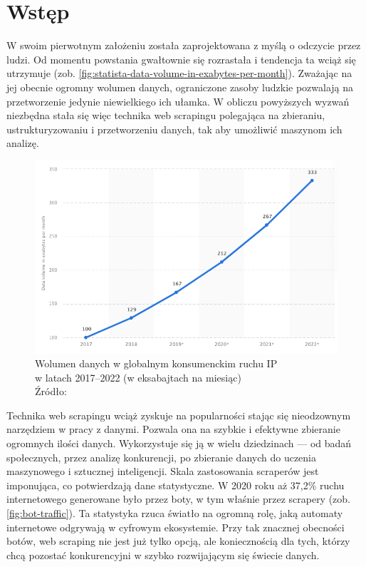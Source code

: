 \newpage


\section{Wstęp}\label{sec:wstep}

W swoim pierwotnym założeniu została zaprojektowana z myślą o odczycie przez ludzi.
Od momentu powstania gwałtownie się rozrastała i tendencja ta wciąż się utrzymuje (zob. \autoref{fig:statista-data-volume-in-exabytes-per-month}).
Zważając na jej obecnie ogromny wolumen danych, ograniczone zasoby ludzkie pozwalają na przetworzenie jedynie niewielkiego ich ułamka.
W obliczu powyższych wyzwań niezbędna stała się więc technika web scrapingu polegająca na zbieraniu, ustrukturyzowaniu i przetworzeniu danych, tak aby umożliwić maszynom ich analizę.

\begin{figure}[H]
    \centering
    \captionsetup{width=.8\linewidth}
    \includegraphics[width=\textwidth]{img/statista-data-volume-in-exabytes-per-month}
    \caption{Wolumen danych w globalnym konsumenckim ruchu IP\\ w latach 2017–2022 (w eksabajtach na miesiąc)\\Źródło: ~\cite{statista-data-volume}}
    \label{fig:statista-data-volume-in-exabytes-per-month}
\end{figure}

Technika web scrapingu wciąż zyskuje na popularności stając się nieodzownym narzędziem w pracy z danymi.
Pozwala ona na szybkie i efektywne zbieranie ogromnych ilości danych.
Wykorzystuje się ją w wielu dziedzinach --- od badań społecznych, przez analizę konkurencji, po zbieranie danych do uczenia maszynowego i sztucznej inteligencji.
Skala zastosowania scraperów jest imponująca, co potwierdzają dane statystyczne.
W 2020 roku aż 37,2\% ruchu internetowego generowane było przez boty, w tym właśnie przez scrapery (zob. \autoref{fig:bot-traffic}).
Ta statystyka rzuca światło na ogromną rolę, jaką automaty internetowe odgrywają w cyfrowym ekosystemie.
Przy tak znacznej obecności botów, web scraping nie jest już tylko opcją, ale koniecznością dla tych, którzy chcą pozostać konkurencyjni w szybko rozwijającym się świecie danych.

